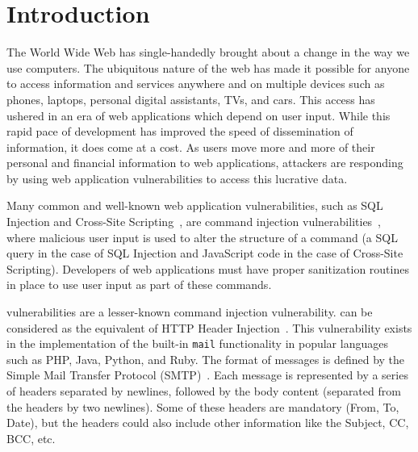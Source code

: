 \section{Introduction}
The World Wide Web has single-handedly brought about a change in the way we use computers. The ubiquitous nature of the web has made it possible for anyone to access information and services anywhere and on multiple devices such as phones, laptops, personal digital assistants, TVs, and cars. This access has ushered in an era of web applications which depend on user input. While this rapid pace of development has improved the speed of dissemination of information, it does come at a cost. As users move more and more of their personal and financial information to web applications, attackers are responding by using web application vulnerabilities to access this lucrative data.


Many common and well-known web application vulnerabilities, such as SQL Injection and Cross-Site Scripting~\cite{OWASPT10}, are command injection vulnerabilities~\cite{commandinjection}, where malicious user input is used to alter the structure of a command (a SQL query in the case of SQL Injection and JavaScript code in the case of Cross-Site Scripting). Developers of web applications must have proper sanitization routines in place to use user input as part of these commands. 

\ehi vulnerabilities are a lesser-known command injection vulnerability. \ehi can be considered as the \email equivalent of HTTP Header Injection~\cite{wiki:HTTP_headerinjection}. This vulnerability exists in the implementation of the built-in \texttt{mail} functionality in popular languages such as PHP, Java, Python, and Ruby. The format of \email messages is defined by the Simple Mail Transfer Protocol (SMTP)~\cite{rfc5322}. Each \email message is represented by a series of headers separated by newlines, followed by the body content (separated from the headers by two newlines). Some of these headers are mandatory (From, To, Date), but the headers could also include other information like the Subject, CC, BCC, etc.

